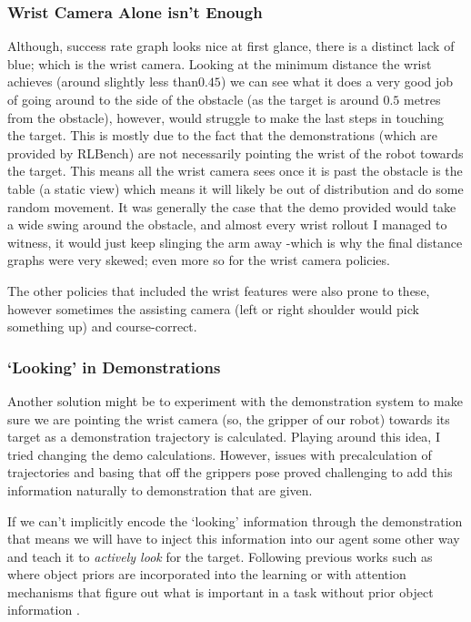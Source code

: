 \subsubsection{Wrist Camera Alone isn't Enough}
Although, success rate graph looks nice at first glance, there is a distinct lack of blue; which is the wrist camera. Looking at the minimum distance the wrist achieves (around slightly less than$0.45$) we can see what it does a very good job of going around to the side of the obstacle (as the target is around $0.5$ metres from the obstacle), however, would struggle to make the last steps in touching the target. This is mostly due to the fact that the demonstrations (which are provided by RLBench) are not necessarily pointing the wrist of the robot towards the target. This means all the wrist camera sees once it is past the obstacle is the table (a static view) which means it will likely be out of distribution and do some random movement. It was generally the case that the demo provided would take a wide swing around the obstacle, and almost every wrist rollout I managed to witness, it would just keep slinging the arm away -which is why the final distance graphs were very skewed; even more so for the wrist camera policies.

The other policies that included the wrist features were also prone to these, however sometimes the assisting camera (left or right shoulder would pick something up) and course-correct.

\subsubsection{`Looking' in Demonstrations}\label{ew-looking-at-target}
Another solution might be to experiment with the demonstration system to make sure we are pointing the wrist camera (so, the gripper of our robot) towards its target as a demonstration trajectory is calculated. Playing around this idea, I tried changing the demo calculations. However, issues with precalculation of trajectories and basing that off the grippers pose proved challenging to add this information naturally to demonstration that are given.

If we can't implicitly encode the `looking' information through the demonstration that means we will have to inject this information into our agent some other way and teach it to \emph{actively look} for the target. Following previous works such as  where object priors are incorporated into the learning or with attention mechanisms that figure out what is important in a task without prior object information .  

